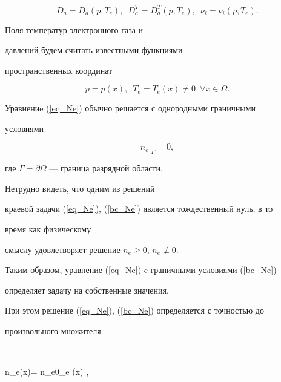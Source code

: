 \begin{equation} \label{Coef} 


D_{a} = D_{a}(p, T_{e}),\ \; D_{a}^{T}


= D_{a}^{T}(p, T_{e}),\ \; \nu_{i} = \nu_{i}(p, T_{e}). 


\end{equation}


Поля температур электронного газа и 


давлений будем считать известными функциями 


пространственных координат 


$$


p=p(x),\ \;T_e=T_e(x)\ne 0 \ \; \forall x\in \Omega.


$$





Уравнениe (\ref{eq_Ne}) обычно решается с однородными граничными 


условиями 


\begin{equation}


\label{bc_Ne}


n_e{}\big|_{\Gamma} = 0, 


\end{equation} 


где $\Gamma=\partial \Omega$ --- граница разрядной области.





Нетрудно видеть, что одним из решений


краевой задачи (\ref{eq_Ne}), (\ref{bc_Ne}) является тождественный нуль, в то


время как физическому 


смыслу удовлетворяет решение $n_{e} \ge 0$, $n_{e} \not\equiv 0$. 


Таким образом, уравнение (\ref{eq_Ne}) c граничными условиями (\ref{bc_Ne}) 


определяет задачу на собственные значения.


При этом решение (\ref{eq_Ne}), (\ref{bc_Ne}) определяется с точностью до 


произвольного множителя


$$




n_{e}(x)= n_{e0}\cdot {}_{e} (x) , 




